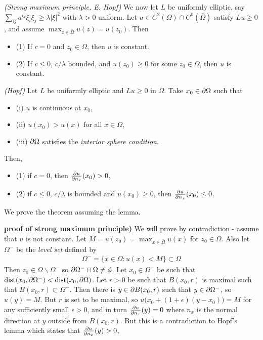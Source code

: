 \documentclass[12pt,a4paper]{article}
\newenvironment{proof}
{\begin{changemargin}{0.5cm}{0.5cm} 
	}%
	{\end{changemargin}
}
\renewenvironment{i}
{\begin{itemize} 
	}%
	{\end{itemize}
}
\newenvironment{p}
{\begin{proof} 
	}%
	{\end{proof}
}
\begin{document}
\s

\thm \emph{(Strong maximum principle, E. Hopf)}  We now let $L$ be uniformly elliptic, say $\sum_{ij} a^{ij} \xi_i \xi_j \geq \lambda |\xi|^2$ with $\lambda>0$ uniform. Let $u\in C^2(\Omega) \cap C^0(\bar{\Omega})$ satisfy $Lu \geq 0$, and assume $\max_{z\in \bar{\Omega}} u(z) = u(z_0)$. Then
\begin{i}
\item[(1)] If $c=0$ and $z_0 \in \Omega$, then $u$ is constant.
\item[(2)] If $c\leq 0$, $c/\lambda$ bounded, and $u(z_0) \geq 0$ for some $z_0 \in \Omega$, then $u$ is constant.
\end{i}
\s

\lem \emph{(Hopf)} Let $L$ be uniformly elliptic and $Lu \geq 0$ in $\Omega$. Take $x_0 \in \partial\Omega$ such that
\begin{i}
\item[(i)] $u$ is continuous at $x_0$,
\item[(ii)] $u(x_0) > u(x)$ for all $x\in \Omega$,
\item[(iii)] $\partial \Omega$ satisfies the \emph{interior sphere condition}.
\end{i}
Then,
\begin{i}
\item[(1)] if $c=0$, then $\frac{\partial u}{\partial n_x} (x_0) >0$,
\item[(2)] if $c\leq 0$, $c/\lambda$ is bounded and $u(x_0) \geq 0$, then $\frac{\partial u}{\partial n_x}(x_0) \leq 0$.
\end{i}
\s

We prove the theorem assuming the lemma.
\s

\begin{p}
\textbf{proof of strong maximum principle)} We will prove by contradiction - assume that $u$ is not constant. Let $M = u(z_0) = \max_{x\in \bar{\Omega}}u(x)$ for $z_0 \in \Omega$. Also let $\Omega^-$ be the \emph{level set} defined by
\begin{align*}
\Omega^- = \{x\in \Omega : u(x) < M  \} \subset \Omega 
\end{align*}
Then $z_0 \in \Omega \backslash \Omega^-$ so $\partial \Omega^- \cap \Omega \neq \phi$. Let $x_0 \in \Omega^-$ be such that $\text{dist}(x_0, \partial \Omega^-) < \text{dist} (x_0, \partial \Omega)$. Let $r>0$ be such that $B(x_0, r)$ is maximal such that $B(x_0, r)\subset \Omega^-$. Then there is $y\in \partial B(x_0, r)$ such that $y\in \partial \Omega^-$, so $u(y) = M$. But $r$ is set to be maximal, so $u\big(x_0 + (1+\epsilon)(y-x_0)\big) =M$ for any sufficiently small $\epsilon >0$, and in turn $\frac{\partial u}{\partial n_x}(y) =0$ where $n_x$ is the normal direction at $y$ outside from $B(x_0, r)$. But this is a contradiction to Hopf's lemma which states that $\frac{\partial u}{\partial n_x}(y)>0$,

\eop
\end{p}
\s
\end{document}
